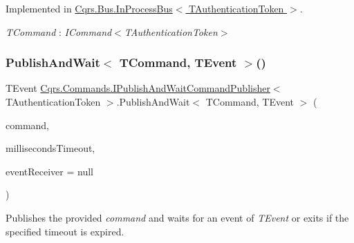 Implemented in \hyperlink{classCqrs_1_1Bus_1_1InProcessBus_a38c0684e313f42bfb36b40703db94ccb_a38c0684e313f42bfb36b40703db94ccb}{Cqrs.\+Bus.\+In\+Process\+Bus$<$ T\+Authentication\+Token $>$}.

\begin{Desc}
\item[Type Constraints]\begin{description}
\item[{\em T\+Command} : {\em I\+Command$<$T\+Authentication\+Token$>$}]\end{description}
\end{Desc}
\mbox{\label{interfaceCqrs_1_1Commands_1_1IPublishAndWaitCommandPublisher_ad3761879cf9e09c9e89cabf8067b6de4_ad3761879cf9e09c9e89cabf8067b6de4}} 
\subsubsection{\texorpdfstring{Publish\+And\+Wait$<$ T\+Command, T\+Event $>$()}{PublishAndWait< TCommand, TEvent >()}\hspace{0.1cm}{\footnotesize\ttfamily [2/6]}}
{\footnotesize\ttfamily T\+Event \hyperlink{interfaceCqrs_1_1Commands_1_1IPublishAndWaitCommandPublisher}{Cqrs.\+Commands.\+I\+Publish\+And\+Wait\+Command\+Publisher}$<$ T\+Authentication\+Token $>$.Publish\+And\+Wait$<$ T\+Command, T\+Event $>$ (\begin{DoxyParamCaption}\item[{T\+Command}]{command,  }\item[{int}]{milliseconds\+Timeout,  }\item[{\hyperlink{interfaceCqrs_1_1Events_1_1IEventReceiver}{I\+Event\+Receiver}$<$ T\+Authentication\+Token $>$}]{event\+Receiver = {\ttfamily null} }\end{DoxyParamCaption})}



Publishes the provided {\itshape command}  and waits for an event of {\itshape T\+Event}  or exits if the specified timeout is expired. 



